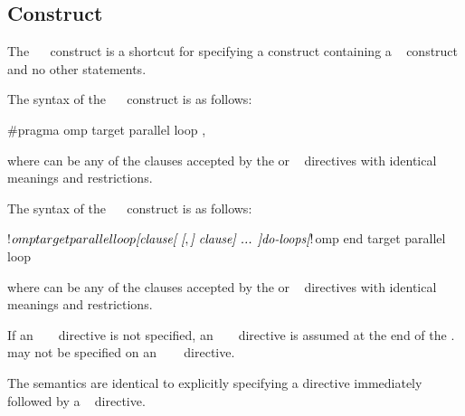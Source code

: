 \subsection{   Construct}
\label{subsec:target parallel loop Construct}
\summary
The ~~ construct is a shortcut for 
specifying a  construct containing a ~ 
construct and no other statements.

\syntax
\begin{ccppspecific}
The syntax of the ~~ construct is as follows:

\begin{ompcPragma}
#pragma omp target parallel loop \plc{[clause[ [},\plc{] clause] ... ] new-line}
\end{ompcPragma}

where  can be any of the clauses accepted by the  
or ~ directives with identical meanings and restrictions.
\end{ccppspecific}

\begin{fortranspecific}
The syntax of the ~~ construct is as follows:

\begin{ompfPragma}
!$omp target parallel loop \plc{[clause[ [},\plc{] clause] ... ]}
    \plc{do-loops}
\plc{[}!$omp end target parallel loop\plc{]}
\end{ompfPragma}

where  can be any of the clauses accepted by the  
or ~ directives with identical meanings and restrictions.

If an ~ ~ directive is not 
specified, an ~ ~ directive 
is assumed at the end of the .  may not be specified 
on an ~~~ directive.
\end{fortranspecific}

\descr
The semantics are identical to explicitly specifying a  directive 
immediately followed by a ~ directive.

